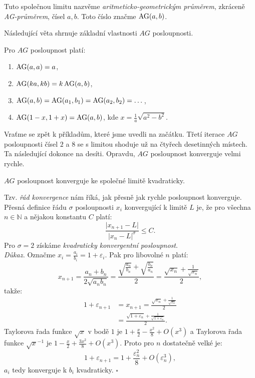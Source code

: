 \documentclass[12pt]{report}
\begin{document}
\begin{definice}
Tuto společnou limitu nazvěme \textit{aritmeticko-geometrickým průměrem}, zkráceně \textit{AG-průměrem}, čísel $a,b$. Toto číslo značme $\operatorname{AG}(a,b)$.
\end{definice}


Následující věta shrnuje základní vlastnosti $AG$ posloupnosti. 

\begin{veta}\label{zkjb}
Pro $AG$ posloupnost platí:
\begin{enumerate}
\item $\operatorname{AG}(a,a) = a$,
\item $\operatorname{AG}(ka,kb) = k \operatorname{AG} (a,b)$,
\item $\operatorname{AG}(a,b) = \operatorname{AG}(a_1,b_1) = \operatorname{AG}(a_2,b_2) = \dots$,
\item $\operatorname{AG}(1-x,1+x) = \operatorname{AG}(a,b)$, kde $x = \frac{1}{a} \sqrt{a^2 - b^2}$.
\end{enumerate}
\end{veta}


Vraťme se zpět k příkladům, které jsme uvedli na začátku. Třetí iterace $AG$ posloupnosti čísel $2$ a $8$ se s limitou shoduje už na čtyřech desetinných místech. Ta následující dokonce na desíti. Opravdu, $AG$ posloupnost konverguje velmi rychle.
\begin{veta}\label{konverg}
$AG$ posloupnost konverguje ke společné limitě kvadraticky.
\end{veta}
Tzv. \textit{řád konvergence} nám říká, jak přesně jak rychle posloupnost konverguje. Přesná definice řádu $\sigma$ posloupnosti $x_i$ konvergující k limitě $L$ je, že pro všechna $n \in \mathbb{N}$ a nějakou konstantu $C$ platí:
$$\frac{\vert x_{n+1} - L \vert}{\vert x_n - L \vert ^ \sigma} \leqslant C.$$
Pro $\sigma = 2$ získáme \textit{kvadraticky konvergentní posloupnost}.\\

\noindent \textit{Důkaz.} Označme $x_i = \frac{a_i}{b_i} = 1 + \varepsilon_i$. Pak pro libovolné $n$ platí:
\begin{equation*}
x_{n+1} = \frac{a_n+b_n}{2 \sqrt{a_n b_n}} = \frac{\sqrt{\frac{a_n}{b_n}} + \sqrt{\frac{b_n}{a_n}}}{2} = \frac{\sqrt{x_n}+\frac{1}{\sqrt{x_n}}}{2},
\end{equation*}
takže:
\begin{align*}
1+\varepsilon_{n+1} &= x_{n+1} =\frac{\sqrt{x_n}+\frac{1}{\sqrt{x_n}}}{2}\\
&= \frac{\sqrt{1+\varepsilon_n} + \frac{1}{\sqrt{1+\varepsilon_n}}}{2}.
\end{align*}
Taylorova řada funkce $\sqrt{x}$ v bodě $1$ je $1+\frac{x}{2} - \frac{x^2}{8} + O(x^3)$ a Taylorova řada funkce $\sqrt{x}^{-1}$ je $1-\frac{x}{2}+\frac{3 x^2}{8} + O(x^3)$. Proto pro $n$ dostatečně velké je:
$$1+\varepsilon_{n+1}  = 1+\frac{\varepsilon_n ^2}{8} + O(\varepsilon_n ^3),$$ 
$a_i$ tedy konverguje k $b_i$ kvadraticky. \hfill $\square$\\
\end{document}
